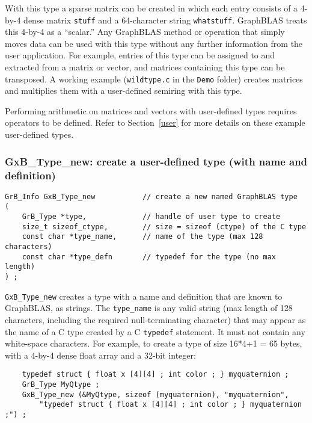 \documentclass[12pt]{article}
\begin{document}
With this type a sparse matrix can be created in which each entry consists of a
4-by-4 dense matrix \verb'stuff' and a 64-character string \verb'whatstuff'.
GraphBLAS treats this 4-by-4 as a ``scalar.'' Any GraphBLAS method or operation
that simply moves data can be used with this type without any further
information from the user application.  For example, entries of this type can
be assigned to and extracted from a matrix or vector, and matrices containing
this type can be transposed.  A working example (\verb'wildtype.c'
in the \verb'Demo' folder) creates matrices and multiplies them with
a user-defined semiring with this type.

Performing arithmetic on matrices and vectors with user-defined types requires
operators to be defined.  Refer to Section~\ref{user} for more details on these
example user-defined types.

\subsubsection{{\sf GxB\_Type\_new:} create a user-defined type (with name and definition)}
\label{type_new_named}

\begin{mdframed}[userdefinedwidth=6in]
{\footnotesize
\begin{verbatim}
GrB_Info GxB_Type_new           // create a new named GraphBLAS type
(
    GrB_Type *type,             // handle of user type to create
    size_t sizeof_ctype,        // size = sizeof (ctype) of the C type
    const char *type_name,      // name of the type (max 128 characters)
    const char *type_defn       // typedef for the type (no max length)
) ;
\end{verbatim}
}\end{mdframed}

\verb'GxB_Type_new' creates a type with a name and definition that are known to
GraphBLAS, as strings.  The \verb'type_name' is any valid string (max length of 128
characters, including the required null-terminating character) that may
appear as the name of a C type created by a C \verb'typedef' statement.  It must
not contain any white-space characters.  For example, to create a type of size
16*4+1 = 65 bytes, with a 4-by-4 dense float array and a 32-bit integer:

    {\footnotesize
    \begin{verbatim}
    typedef struct { float x [4][4] ; int color ; } myquaternion ;
    GrB_Type MyQtype ;
    GxB_Type_new (&MyQtype, sizeof (myquaternion), "myquaternion",
        "typedef struct { float x [4][4] ; int color ; } myquaternion ;") ; \end{verbatim}}
\end{document}
